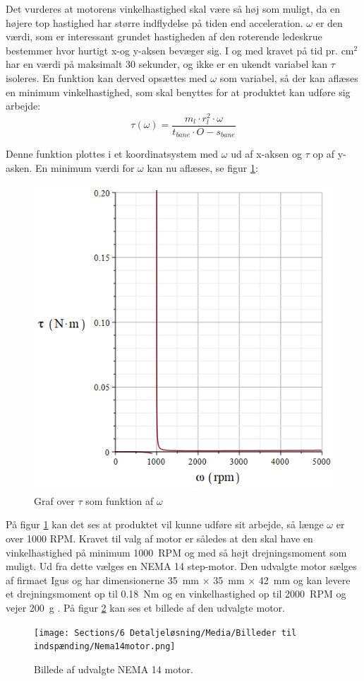 Det vurderes at motorens vinkelhastighed skal være så høj som muligt, da en højere top hastighed har større indflydelse på tiden end acceleration. \(\omega\) er den værdi, som er interessant grundet hastigheden af den roterende ledeskrue bestemmer hvor hurtigt x-og y-aksen bevæger sig. I og med kravet på tid pr. cm\(^2\) har en værdi på maksimalt 30 sekunder, og ikke er en ukendt variabel kan \(\tau\) isoleres. 
En funktion kan derved opsættes med \(\omega\) som variabel, så der kan aflæses en minimum vinkelhastighed, som skal benyttes for at produktet kan udføre sig arbejde:
\begin{equation}
    \tau(\omega)=\dfrac{m_{l} \cdot r_{l}^2 \cdot \omega}{t_{bane} \cdot O - s_{bane}}
\end{equation}

Denne funktion plottes i et koordinatsystem med \(\omega\) ud af x-aksen og \(\tau\) op af y-asken. En minimum værdi for \(\omega\) kan nu aflæses, se figur \ref{fig: Tau-Omega plot}:
\begin{figure}[H]
    \centering
    \includegraphics[width=0.5\linewidth]{Sections/6 Detaljeløsning/Media/Billeder til indspænding/tau-omegaplot.png}
    \caption{Graf over \(\tau\) som funktion af \(\omega\)}
    \label{fig: Tau-Omega plot}
\end{figure}

På figur \ref{fig: Tau-Omega plot} kan det ses at produktet vil kunne udføre sit arbejde, så længe \(\omega\) er over 1000 RPM. Kravet til valg af motor er således at den skal have en vinkelhastighed på minimum \SI{1000}{RPM} og med så højt drejningsmoment som muligt. Ud fra dette vælges en NEMA 14 step-motor. Den udvalgte motor sælges af firmaet Igus og har dimensionerne \SI{35}{mm} \(\times\) \SI{35}{mm} \(\times\) \SI{42}{mm} og kan levere et drejningsmoment op til \SI{0.18}{Nm} og en vinkelhastighed op til \SI{2000}{RPM} og vejer \SI{200}{g} \parencite{Igus2025DrylinNEMA14}. På figur \ref{fig:Udvalgte motor} kan ses et billede af den udvalgte motor. 
\begin{figure}[H]
    \centering
    \texttt{[image: Sections/6 Detaljeløsning/Media/Billeder til indspænding/Nema14motor.png]}
        \caption{Billede af udvalgte NEMA 14 motor. \parencite{Igus2025DrylinNEMA14}}
        \label{fig:Udvalgte motor}
\end{figure}

